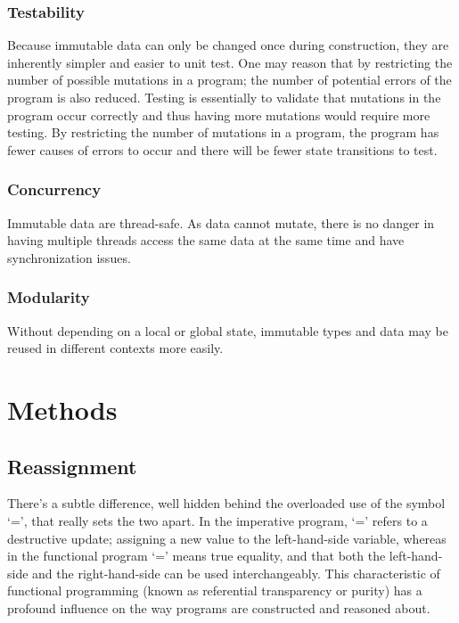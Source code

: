 \documentclass[12pt,twoside]{article}
\begin{document}
\subsubsection{Testability} Because immutable data can only be changed once during construction, they are inherently
simpler and easier to unit test. One may reason that by restricting the number of possible mutations
in a program; the number of potential errors of the program is also reduced. Testing is essentially
to validate that mutations in the program occur correctly and thus having more mutations would require more testing. By restricting the number of mutations in a program, the program has
fewer causes of errors to occur and there will be fewer state transitions to test.

\subsubsection{Concurrency} Immutable data are thread-safe. As data cannot mutate, there is no danger in having
multiple threads access the same data at the same time and have synchronization issues.

\subsubsection{Modularity} Without depending on a local or global state, immutable types and data may be reused
in different contexts more easily.

\newpage
\section{Methods}

\subsection{Reassignment}
There's a subtle difference, well
hidden behind the overloaded use of the symbol
‘=’, that really sets the two apart. In the imperative
program, ‘=’ refers to a destructive update; assigning
a new value to the left-hand-side variable,
whereas in the functional program ‘=’ means true
equality, and that both the left-hand-side and the right-hand-side can be used interchangeably. This characteristic
of functional programming (known as referential
transparency or purity) has a profound influence
on the way programs are constructed and reasoned
about.

\end{document}
